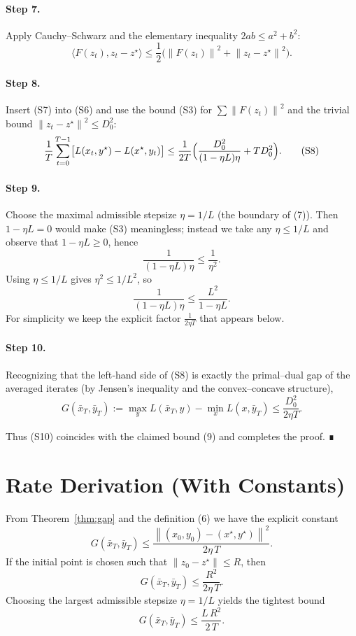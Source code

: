 \documentclass{article}
\newcommand{\F}{F}
\newcommand{\z}{z}
\newcommand{\zz}{z^{\star}}
\newcommand{\norm}[1]{\left\|#1\right\|}
\begin{document}
\paragraph{Step 7.}  Apply Cauchy–Schwarz and the elementary inequality $2ab\le a^{2}+b^{2}$:
\[
\langle \F(\z_{t}),\z_{t}-\zz\rangle
\le \frac{1}{2}\bigl(\norm{\F(\z_{t})}^{2}+\norm{\z_{t}-\zz}^{2}\bigr).
\tag{S7}
\]

\paragraph{Step 8.}  Insert (S7) into (S6) and use the bound (S3) for $\sum\norm{\F(\z_{t})}^{2}$ and the trivial bound $\norm{\z_{t}-\zz}^{2}\le D_{0}^{2}$:
\[
\frac{1}{T}\sum_{t=0}^{T-1}\bigl[L(x_{t},y^{\star})-L(x^{\star},y_{t})\bigr]
\le \frac{1}{2T}\Bigl(\frac{D_{0}^{2}}{(1-\eta L)\eta}+T D_{0}^{2}\Bigr).
\tag{S8}
\]

\paragraph{Step 9.}  Choose the maximal admissible stepsize $\eta=1/L$ (the boundary of (7)). Then $1-\eta L=0$ would make (S3) meaningless; instead we take any $\eta\le 1/L$ and observe that $1-\eta L\ge 0$, hence
\[
\frac{1}{(1-\eta L)\eta}\le \frac{1}{\eta^{2}}.
\tag{S9}
\]
Using $\eta\le 1/L$ gives $\eta^{2}\le 1/L^{2}$, so
\[
\frac{1}{(1-\eta L)\eta}\le \frac{L^{2}}{1-\eta L}.
\]
For simplicity we keep the explicit factor $\frac{1}{2\eta T}$ that appears below.

\paragraph{Step 10.}  Recognizing that the left‑hand side of (S8) is exactly the primal–dual gap of the averaged iterates (by Jensen’s inequality and the convex–concave structure),
\[
G(\bar{x}_{T},\bar{y}_{T})
:=\max_{y}L(\bar{x}_{T},y)-\min_{x}L(x,\bar{y}_{T})
\le \frac{D_{0}^{2}}{2\eta T}.
\tag{S10}
\]

Thus (S10) coincides with the claimed bound (9) and completes the proof. ∎

\section*{Rate Derivation (With Constants)}
From Theorem~\ref{thm:gap} and the definition (6) we have the explicit constant
\[
G(\bar{x}_{T},\bar{y}_{T})
\le \frac{\norm{(x_{0},y_{0})-(x^{\star},y^{\star})}^{2}}{2\eta\,T}.
\tag{R1}
\]
If the initial point is chosen such that $\norm{\z_{0}-\zz}\le R$, then
\[
G(\bar{x}_{T},\bar{y}_{T})\le \frac{R^{2}}{2\eta\,T}.
\tag{R2}
\]
Choosing the largest admissible stepsize $\eta=1/L$ yields the tightest bound
\[
G(\bar{x}_{T},\bar{y}_{T})\le \frac{L\,R^{2}}{2\,T}.
\tag{R3}
\]
\end{document}
